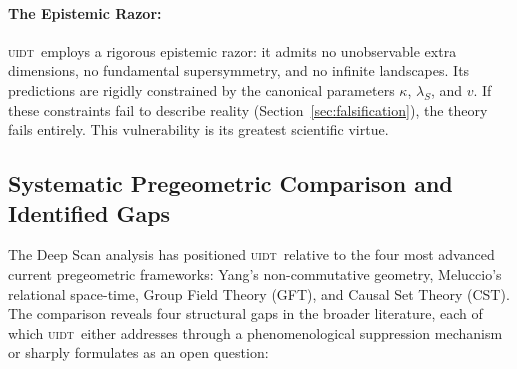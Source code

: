 \documentclass[12pt,a4paper,twoside]{article}
\theoremstyle{plain}
\theoremstyle{definition}
\theoremstyle{remark}
\newcommand{\UIDT}{\textsc{uidt}}
\begin{document}
\paragraph{The Epistemic Razor:}
\UIDT\ employs a rigorous epistemic razor: it admits no unobservable extra
dimensions, no fundamental supersymmetry, and no infinite landscapes. Its
predictions are rigidly constrained by the canonical parameters $\kappa$,
$\lambda_S$, and $v$. If these constraints fail to describe reality
(Section~\ref{sec:falsification}), the theory fails entirely. This vulnerability
is its greatest scientific virtue.

\subsection{Systematic Pregeometric Comparison and Identified Gaps}
\label{subsec:deep-scan}

The Deep Scan analysis has positioned \UIDT\ relative to the four most advanced
current pregeometric frameworks: Yang's non-commutative geometry,
Meluccio's relational space-time, Group Field Theory (GFT), and Causal Set
Theory (CST). The comparison reveals four structural gaps in the broader
literature, each of which \UIDT\ either addresses through a phenomenological
suppression mechanism or sharply formulates as an open question:
\end{document}
